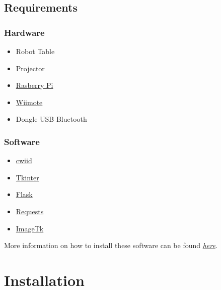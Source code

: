 \documentclass[letterpaper,10pt,english]{sphinxmanual}
\begin{document}
\subsection{Requirements}
\label{user/intro:requirements}\label{user/intro:id1}

\subsubsection{Hardware}
\label{user/intro:hardware}\begin{itemize}
\item {} 
Robot Table

\item {} 
Projector

\item {} 
\href{http://www.raspberrypi.org/}{Rasberry Pi}

\item {} 
\href{http://www.amazon.com/Wii-Remote-Controller-Nintendo/dp/B000IMWK2G}{Wiimote}

\item {} 
Dongle USB Bluetooth

\end{itemize}


\subsubsection{Software}
\label{user/intro:software}\begin{itemize}
\item {} 
\href{https://github.com/abstrakraft/cwiid}{cwiid}

\item {} 
\href{http://docs.python.org/2/library/tkinter.html}{Tkinter}

\item {} 
\href{http://flask.pocoo.org/}{Flask}

\item {} 
\href{http://docs.python-requests.org/en/latest/\#}{Requests}

\item {} 
\href{http://effbot.org/imagingbook/imagetk.htm}{ImageTk}

\end{itemize}

More information on how to install these software can be found {\hyperref[user/install:installrequirements]{\emph{here}}}.


\section{Installation}
\label{user/install:installation}\label{user/install::doc}
\end{document}
